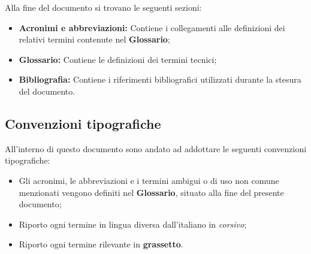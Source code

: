 Alla fine del documento si trovano le seguenti sezioni:
\begin{itemize}
    \item \textbf{Acronimi e abbreviazioni:} Contiene i collegamenti alle definizioni dei relativi termini contenute nel \textbf{Glossario};
    \item \textbf{Glossario:} Contiene le definizioni dei termini tecnici;
    \item \textbf{Bibliografia:} Contiene i riferimenti bibliografici utilizzati durante la stesura del documento.
\end{itemize}

\subsection*{Convenzioni tipografiche}
All'interno di questo documento sono andato ad addottare le seguenti convenzioni tipografiche:
\begin{itemize}
    \item Gli acronimi, le abbreviazioni e i termini ambigui o di uso non comune menzionati vengono definiti nel \textbf{Glossario}, situato alla fine del presente documento;
    \item Riporto ogni termine in lingua diversa dall'italiano in \textit{corsivo};
    \item Riporto ogni termine rilevante in \textbf{grassetto}.
\end{itemize}




\normalsize

\endgroup

\vfill
